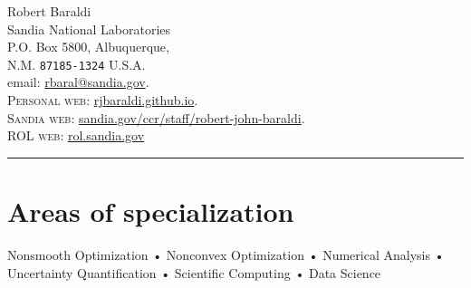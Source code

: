 \documentclass[12pt, a4paper]{article}
\begin{document}
{\LARGE Robert Baraldi}\\%
Sandia National Laboratories\\
P.O. Box 5800, Albuquerque,\\
N.M. \texttt{87185-1324}
U.S.A.\\
email: \href{mailto:rbaral@sandia.gov}{rbaral@sandia.gov}.\\
\textsc{Personal web}: \href{http://rjbaraldi.github.io}{rjbaraldi.github.io}.\\
\textsc{Sandia web}: \href{https://www.sandia.gov/ccr/staff/robert-john-baraldi/}{sandia.gov/ccr/staff/robert-john-baraldi}.\\
\textsc{ROL web}: \href{https://rol.sandia.gov/}{rol.sandia.gov}

\hrule
\section*{Areas of specialization}
Nonsmooth Optimization • Nonconvex Optimization • Numerical Analysis • Uncertainty Quantification • Scientific Computing • Data Science
\end{document}
